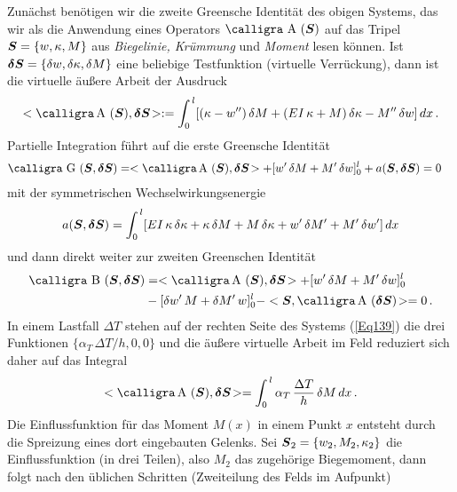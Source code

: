 Zun\"{a}chst ben\"{o}tigen wir die zweite Greensche Identit\"{a}t des obigen Systems, das wir als die Anwendung eines Operators $\text{\normalfont\calligra A\,\,}(\vek S)$ auf das Tripel $\mbox{\boldmath $S$} = \{w, \kappa, M\}$ aus {\em Biegelinie, Kr\"{u}mmung\/} und {\em Moment\/} lesen k\"{o}nnen. Ist $ \mbox{\boldmath $\delta$} \mbox{\boldmath $S$} = \{\delta w, \delta \kappa, \delta M\} $ eine beliebige Testfunktion (virtuelle Verr\"{u}ckung), dann ist die virtuelle \"{a}u{\ss}ere Arbeit der Ausdruck
\begin{align}
<\text{\normalfont\calligra \!A\,\,}(\vek S), \vek  \delta \vek S\!> := \int_0^{\,l} [(\kappa - w'')\,\delta M + (EI\,\kappa + M)\,\delta \kappa - M''\,\delta w]\,dx\,.
\end{align}
Partielle Integration f\"{u}hrt auf die erste Greensche Identit\"{a}t
\begin{align}
\text{\normalfont\calligra G\,\,}(\vek S, \vek \delta \vek S)
&= <\text{\normalfont\calligra \!A\,\,}(\vek S), \vek  \delta\vek S\!>
 + [w'\,\delta M + M'\,\delta w]_0^l + a(\vek S, \vek  \delta \vek S) = 0
\end{align}
mit der symmetrischen Wechselwirkungsenergie
\begin{align}
a(\mbox{\boldmath $S$}, \mbox{\boldmath $\delta$} \mbox{\boldmath $S$}) = \int_0^{\,l} [EI\,\kappa\, \delta \kappa + \kappa \,\delta M + M\,\delta \kappa + w'\,\delta M' + M'\,\delta w']\,dx
\end{align}
und dann direkt weiter zur zweiten Greenschen Identit\"{a}t
\begin{align}
\text{\normalfont\calligra B\,\,}(\vek S, \vek \delta \vek S)
&= <\text{\normalfont\calligra \!A\,\,}(\vek S), \vek  \delta\vek S\!>
 + [w'\,\delta M + M'\,\delta w]_0^l\nn \\
  &- [\delta w'\, M + \delta M'\, w]_0^l - <\vek S,\text{\normalfont\calligra \!A\,\,}(\vek  \delta \vek S)\!> = 0\,.
\end{align}
In einem Lastfall $\Delta T$ stehen auf der rechten Seite des Systems (\ref{Eq139}) die drei Funktionen $\{\alpha_T\,\Delta T/h, 0, 0\}$ und die \"{a}u{\ss}ere virtuelle Arbeit im Feld reduziert sich daher auf das Integral
\begin{align}
<\text{\normalfont\calligra \!A\,\,}(\vek S), \vek  \delta \vek S\!> = \int_0^{\,l} \alpha_T\,\frac{\Delta T}{h} \,\delta M\,dx\,.
\end{align}
Die Einflussfunktion f\"{u}r das Moment $M(x)$ in einem Punkt $x$ entsteht durch die Spreizung eines dort eingebauten Gelenks. Sei $\mbox{\boldmath $S$}_2 = \{w_2, M_2, \kappa_2\}$ die Einflussfunktion (in drei Teilen), also $M_2$ das zugeh\"{o}rige Biegemoment, dann folgt nach den \"{u}blichen Schritten (Zweiteilung des Felds im Aufpunkt)
